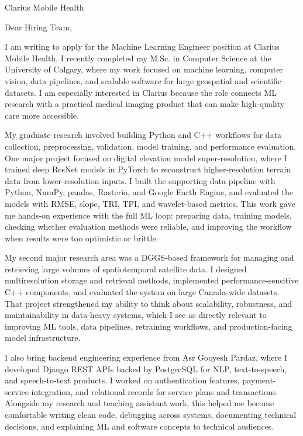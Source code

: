 \documentclass[11pt]{letter}
\begin{document}
\begin{letter}{Clarius Mobile Health}

\opening{Dear Hiring Team,}

I am writing to apply for the Machine Learning Engineer position at Clarius Mobile Health. I recently completed my M.Sc. in Computer Science at the University of Calgary, where my work focused on machine learning, computer vision, data pipelines, and scalable software for large geospatial and scientific datasets. I am especially interested in Clarius because the role connects ML research with a practical medical imaging product that can make high-quality care more accessible.

My graduate research involved building Python and C++ workflows for data collection, preprocessing, validation, model training, and performance evaluation. One major project focused on digital elevation model super-resolution, where I trained deep ResNet models in PyTorch to reconstruct higher-resolution terrain data from lower-resolution inputs. I built the supporting data pipeline with Python, NumPy, pandas, Rasterio, and Google Earth Engine, and evaluated the models with RMSE, slope, TRI, TPI, and wavelet-based metrics. This work gave me hands-on experience with the full ML loop: preparing data, training models, checking whether evaluation methods were reliable, and improving the workflow when results were too optimistic or brittle.

My second major research area was a DGGS-based framework for managing and retrieving large volumes of spatiotemporal satellite data. I designed multiresolution storage and retrieval methods, implemented performance-sensitive C++ components, and evaluated the system on large Canada-wide datasets. That project strengthened my ability to think about scalability, robustness, and maintainability in data-heavy systems, which I see as directly relevant to improving ML tools, data pipelines, retraining workflows, and production-facing model infrastructure.

I also bring backend engineering experience from Asr Gooyesh Pardaz, where I developed Django REST APIs backed by PostgreSQL for NLP, text-to-speech, and speech-to-text products. I worked on authentication features, payment-service integration, and relational records for service plans and transactions. Alongside my research and teaching assistant work, this helped me become comfortable writing clean code, debugging across systems, documenting technical decisions, and explaining ML and software concepts to technical audiences.


\end{letter}
\end{document}
